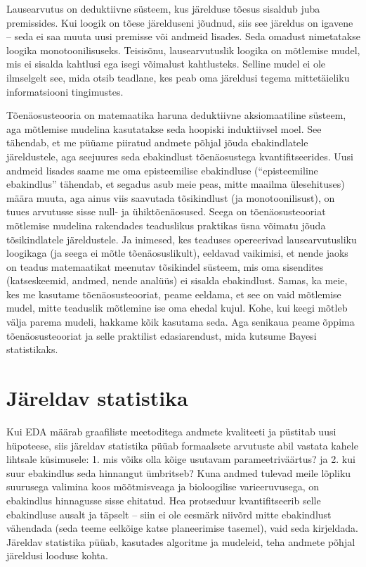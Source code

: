 \documentclass[]{book}
\begin{document}
Lausearvutus on deduktiivne süsteem, kus järelduse tõesus sisaldub juba
premissides. Kui loogik on tõese järelduseni jõudnud, siis see järeldus
on igavene -- seda ei saa muuta uusi premisse või andmeid lisades. Seda
omadust nimetatakse loogika monotoonilisuseks. Teisisõnu,
lausearvutuslik loogika on mõtlemise mudel, mis ei sisalda kahtlusi ega
isegi võimalust kahtlusteks. Selline mudel ei ole ilmselgelt see, mida
otsib teadlane, kes peab oma järeldusi tegema mittetäieliku
informatsiooni tingimustes.

Tõenäosusteooria on matemaatika haruna deduktiivne aksiomaatiline
süsteem, aga mõtlemise mudelina kasutatakse seda hoopiski induktiivsel
moel. See tähendab, et me püüame piiratud andmete põhjal jõuda
ebakindlatele järeldustele, aga seejuures seda ebakindlust tõenäosustega
kvantifitseerides. Uusi andmeid lisades saame me oma episteemilise
ebakindluse (``episteemiline ebakindlus'' tähendab, et segadus asub meie
peas, mitte maailma ülesehituses) määra muuta, aga ainus viis saavutada
tõsikindlust (ja monotoonilisust), on tuues arvutusse sisse null- ja
ühiktõenäosused. Seega on tõenäosusteooriat mõtlemise mudelina
rakendades teaduslikus praktikas üsna võimatu jõuda tõsikindlatele
järeldustele. Ja inimesed, kes teaduses opereerivad lausearvutusliku
loogikaga (ja seega ei mõtle tõenäosuslikult), eeldavad vaikimisi, et
nende jaoks on teadus matemaatikat meenutav tõsikindel süsteem, mis oma
sisendites (katseskeemid, andmed, nende analüüs) ei sisalda ebakindlust.
Samas, ka meie, kes me kasutame tõenäosusteooriat, peame eeldama, et see
on vaid mõtlemise mudel, mitte teaduslik mõtlemine ise oma ehedal kujul.
Kohe, kui keegi mõtleb välja parema mudeli, hakkame kõik kasutama seda.
Aga senikaua peame õppima tõenäosusteooriat ja selle praktilist
edasiarendust, mida kutsume Bayesi statistikaks.

\chapter{Järeldav statistika}\label{jareldav-statistika}

Kui EDA määrab graafiliste meetoditega andmete kvaliteeti ja püstitab
uusi hüpoteese, siis järeldav statistika püüab formaalsete arvutuste
abil vastata kahele lihtsale küsimusele: 1. mis võiks olla kõige
usutavam parameetriväärtus? ja 2. kui suur ebakindlus seda hinnangut
ümbritseb? Kuna andmed tulevad meile lõpliku suurusega valimina koos
mõõtmisveaga ja bioloogilise varieeruvusega, on ebakindlus hinnagusse
sisse ehitatud. Hea protseduur kvantifitseerib selle ebakindluse ausalt
ja täpselt -- siin ei ole eesmärk niivõrd mitte ebakindlust vähendada
(seda teeme eelkõige katse planeerimise tasemel), vaid seda kirjeldada.
Järeldav statistika püüab, kasutades algoritme ja mudeleid, teha andmete
põhjal järeldusi looduse kohta.
\end{document}
